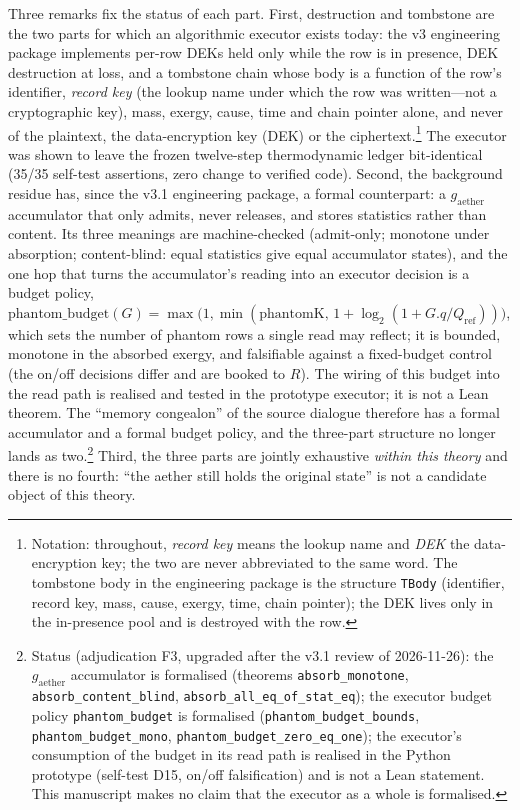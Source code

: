 \documentclass[11pt,a4paper]{article}
\newcommand{\gaether}{g_{\mathrm{aether}}}
\begin{document}
Three remarks fix the status of each part. First, destruction and tombstone are the two parts for which an algorithmic executor exists today: the v3 engineering package implements per-row DEKs held only while the row is in presence, DEK destruction at loss, and a tombstone chain whose body is a function of the row's identifier, \emph{record key} (the lookup name under which the row was written---not a cryptographic key), mass, exergy, cause, time and chain pointer alone, and never of the plaintext, the data-encryption key (DEK) or the ciphertext.\footnote{Notation: throughout, \emph{record key} means the lookup name and \emph{DEK} the data-encryption key; the two are never abbreviated to the same word. The tombstone body in the engineering package is the structure \texttt{TBody} (identifier, record key, mass, cause, exergy, time, chain pointer); the DEK lives only in the in-presence pool and is destroyed with the row.} The executor was shown to leave the frozen twelve-step thermodynamic ledger bit-identical (35/35 self-test assertions, zero change to verified code). Second, the background residue has, since the v3.1 engineering package, a formal counterpart: a $\gaether$ accumulator that only admits, never releases, and stores statistics rather than content. Its three meanings are machine-checked (admit-only; monotone under absorption; content-blind: equal statistics give equal accumulator states), and the one hop that turns the accumulator's reading into an executor decision is a budget policy, $\mathrm{phantom\_budget}(G)=\max\!\big(1,\min(\mathrm{phantomK},\,1+\log_2(1+G.q/Q_{\mathrm{ref}}))\big)$, which sets the number of phantom rows a single read may reflect; it is bounded, monotone in the absorbed exergy, and falsifiable against a fixed-budget control (the on/off decisions differ and are booked to $R$). The wiring of this budget into the read path is realised and tested in the prototype executor; it is not a Lean theorem. The ``memory congealon'' of the source dialogue therefore has a formal accumulator and a formal budget policy, and the three-part structure no longer lands as two.\footnote{Status (adjudication F3, upgraded after the v3.1 review of 2026-11-26): the $\gaether$ accumulator is formalised (theorems \texttt{absorb\_monotone}, \texttt{absorb\_content\_blind}, \texttt{absorb\_all\_eq\_of\_stat\_eq}); the executor budget policy \texttt{phantom\_budget} is formalised (\texttt{phantom\_budget\_bounds}, \texttt{phantom\_budget\_mono}, \texttt{phantom\_budget\_zero\_eq\_one}); the executor's consumption of the budget in its read path is realised in the Python prototype (self-test D15, on/off falsification) and is not a Lean statement. This manuscript makes no claim that the executor as a whole is formalised.} Third, the three parts are jointly exhaustive \emph{within this theory} and there is no fourth: ``the aether still holds the original state'' is not a candidate object of this theory.
\end{document}
